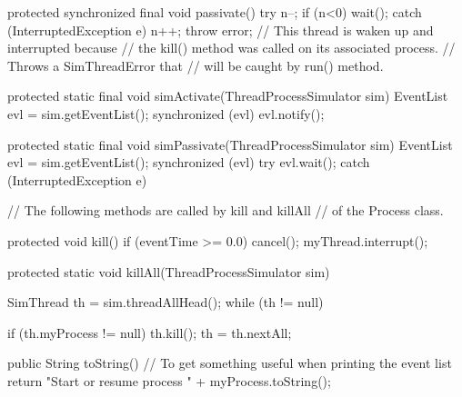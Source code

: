 \begin{code}
\begin{hide}
{   protected synchronized final void passivate() {
      try {n--;  if (n<0)  wait();}
         catch (InterruptedException e) {
            n++;   throw error;
             // This thread is waken up and interrupted because
             // the kill() method was called on its associated process.
             // Throws a SimThreadError that
             // will be caught by run() method.
         }
   }


   protected static final void simActivate(ThreadProcessSimulator sim) {
      EventList evl = sim.getEventList();
      synchronized (evl) {evl.notify(); }
   }

   protected static final void simPassivate(ThreadProcessSimulator sim) {
      EventList evl = sim.getEventList();
      synchronized (evl) {
         try { evl.wait(); } catch (InterruptedException e) {}
      }
   }

   // The following methods are called by kill and killAll
   // of the Process class.

   protected void kill() {
        if (eventTime >= 0.0)
           cancel();
        myThread.interrupt();
   }

   protected static void  killAll(ThreadProcessSimulator sim) {
       SimThread th = sim.threadAllHead();
       while (th != null) {
           if (th.myProcess != null) th.kill();
           th = th.nextAll;

       }
   }

   public String toString() {
      // To get something useful when printing the event list
      return "Start or resume process " + myProcess.toString();
   }
}
\end{hide}
\end{code}
